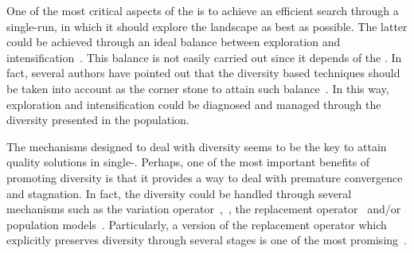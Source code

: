 One of the most critical aspects of the \EAS{} is to achieve an efficient search through a single-run, in which it should explore the landscape as best as possible.
%
The latter could be achieved through an ideal balance between exploration and intensification~\cite{lin2009auto}.
%
This balance is not easily carried out since it depends of the \MOP{}.
%
In fact, several authors have pointed out that the diversity based techniques should be taken into account as the corner stone to attain such balance~\cite{vcrepinvsek2013exploration}.
%
In this way, exploration and intensification could be diagnosed and managed through the diversity presented in the population.
%


The mechanisms designed to deal with diversity seems to be the key to attain quality solutions in single-\EAS{}.
%
Perhaps, one of the most important benefits of promoting diversity is that it provides a way to deal with premature convergence and stagnation.
%
In fact, the diversity could be handled through several mechanisms such as the variation operator~\cite{herrera2003fuzzy},~\cite{mitchell1998introduction}, the replacement operator~\cite{segura2015novel} and/or population models~\cite{koumousis2006saw}.
%
Particularly, a version of the replacement operator which explicitly preserves diversity through several stages is one of the most promising~\cite{vcrepinvsek2013exploration}.
%

